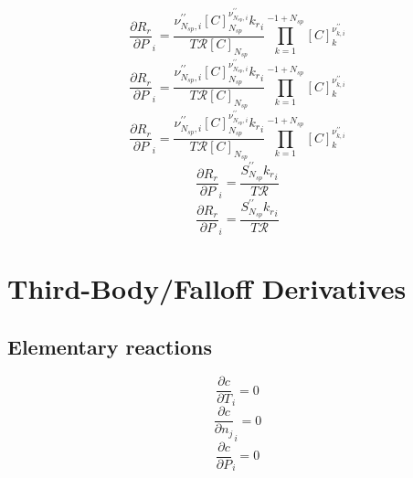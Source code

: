 \documentclass[a4paper,10pt]{article}
\newcommand{\ns}{N_{sp}}
\newcommand{\Ru}{\mathcal{R}}
\begin{document}
\begin{dmath} \frac{\partial {R_r} }{\partial P }_{i} = \frac{\nu^{\prime\prime}_{\ns,i} [C]_{\ns}^{\nu^{\prime\prime}_{\ns,i}} {k_r}_{i}}{T \Ru [C]_{\ns}} \prod_{k=1}^{-1 + \ns} [C]_{k}^{\nu^{\prime\prime}_{k,i}}\end{dmath} 
\begin{dmath} \frac{\partial {R_r} }{\partial P }_{i} = \frac{\nu^{\prime\prime}_{\ns,i} [C]_{\ns}^{\nu^{\prime\prime}_{\ns,i}} {k_r}_{i}}{T \Ru [C]_{\ns}} \prod_{k=1}^{-1 + \ns} [C]_{k}^{\nu^{\prime\prime}_{k,i}}\end{dmath} 
\begin{dmath} \frac{\partial {R_r} }{\partial P }_{i} = \frac{\nu^{\prime\prime}_{\ns,i} [C]_{\ns}^{\nu^{\prime\prime}_{\ns,i}} {k_r}_{i}}{T \Ru [C]_{\ns}} \prod_{k=1}^{-1 + \ns} [C]_{k}^{\nu^{\prime\prime}_{k,i}}\end{dmath} 
\begin{dmath} \frac{\partial {R_r} }{\partial P }_{i} = \frac{S^{\prime\prime}_{\ns} {k_r}_{i}}{T \Ru}\end{dmath} 
\begin{dmath} \frac{\partial {R_r} }{\partial P }_{i} = \frac{S^{\prime\prime}_{\ns} {k_r}_{i}}{T \Ru}\end{dmath} 
\section{Third-Body\slash Falloff Derivatives}
\subsection{Elementary reactions
}
\begin{dmath} \frac{\partial c }{\partial T }_{i} = 0\end{dmath} 
\begin{dmath} \frac{\partial c }{\partial {n_j} }_{i} = 0\end{dmath} 
\begin{dmath} \frac{\partial c }{\partial P }_{i} = 0\end{dmath} 
\end{document}
